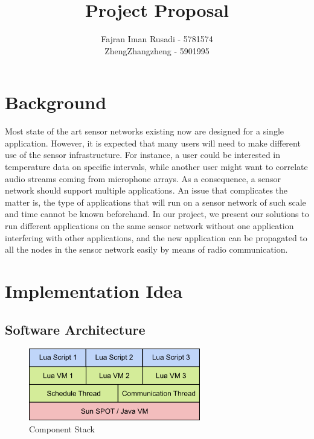 \documentclass[a4paper,11pt]{article}
\begin{document}
\title{Project Proposal}

\author{Fajran Iman Rusadi - 5781574\\
ZhengZhangzheng - 5901995}

\date{}
\maketitle

\section{Background}

Most state of the art sensor networks existing now are designed for a single
application. However, it is expected that many users will need to make
different use of the sensor infrastructure. For instance, a user could be
interested in temperature data on specific intervals, while another user might
want to correlate audio streams coming from microphone arrays. As a
consequence, a sensor network should support multiple applications. An issue
that complicates the matter is, the type of applications that will run on a
sensor network of such scale and time cannot be known beforehand. In our
project, we present our solutions to run different applications on the same
sensor network without one application interfering with other applications, and
the new application can be propagated to all the nodes in the sensor network
easily by means of radio communication.

\section{Implementation Idea}

\subsection{Software Architecture}

\begin{figure}[htbp]
	\centering
	\includegraphics[width=7.5cm]{stack}
	\caption{Component Stack}
	\label{fig:stack}
\end{figure}
\end{document}
